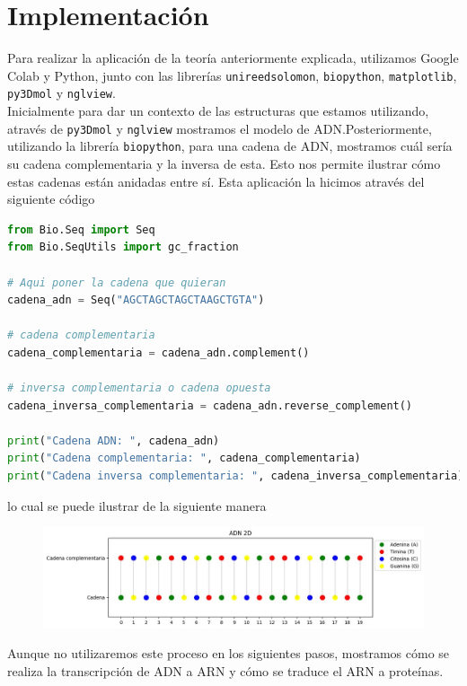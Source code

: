 \section{Implementación} 
Para realizar la aplicación de la teoría anteriormente explicada, utilizamos Google Colab y Python, junto con las librerías \texttt{unireedsolomon}, \texttt{biopython}, \texttt{matplotlib}, \texttt{py3Dmol} y \texttt{nglview}.\\
Inicialmente para dar un contexto de las estructuras que estamos utilizando, através de \texttt{py3Dmol} y \texttt{nglview} mostramos el modelo de ADN.Posteriormente, utilizando la librería \texttt{biopython}, para una cadena de ADN, mostramos cuál sería su cadena complementaria y la inversa de esta. Esto nos permite ilustrar cómo estas cadenas están anidadas entre sí. Esta aplicación la hicimos através del siguiente código 

\begin{lstlisting}[language=Python]
from Bio.Seq import Seq 
from Bio.SeqUtils import gc_fraction

# Aqui poner la cadena que quieran
cadena_adn = Seq("AGCTAGCTAGCTAAGCTGTA")

# cadena complementaria
cadena_complementaria = cadena_adn.complement()

# inversa complementaria o cadena opuesta
cadena_inversa_complementaria = cadena_adn.reverse_complement()

print("Cadena ADN: ", cadena_adn)
print("Cadena complementaria: ", cadena_complementaria)
print("Cadena inversa complementaria: ", cadena_inversa_complementaria)
\end{lstlisting}
lo cual se puede ilustrar de la siguiente manera
\begin{figure}[h]
\centering
        \includegraphics[scale=0.25]{adn1.jpeg} 
    \end{figure}

Aunque no utilizaremos este proceso en los siguientes pasos, mostramos cómo se realiza la transcripción de ADN a ARN y cómo se traduce el ARN a proteínas.

